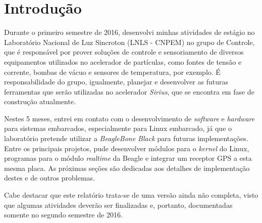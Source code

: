 \section {Introdução}

Durante o primeiro semestre de 2016, desenvolvi minhas atividades de estágio no
Laboratório Nacional de Luz Sincroton (LNLS - CNPEM) no grupo de Controle, que
é responsável por prover soluções de controle e sensoriamento de diversos
equipamentos utilizados no acelerador de partículas, como fontes de tensão e
corrente, bombas de vácuo e sensores de temperatura, por exemplo. É
responsabilidade do grupo, igualmente, planejar e desenvolver as futuras
ferramentas que serão utilizadas no acelerador \textit{Sirius}, que se encontra em fase de construção
atualmente.

\vspace{12pt}

Nestes 5 meses, entrei em contato com o desenvolvimento
de \textit{software} e \textit{hardware} para sistemas embarcados, especialmente
para Linux embarcado, já que o laboratório pretende utilizar a
\textit{BeagleBone Black} para futuras implementações. Entre os principais
projetos, pude desenvolver módulos para o \textit{kernel} do Linux, programas
para o módulo \textit{realtime} da Beagle e integrar um receptor GPS a esta
mesma placa. As próximas seções são dedicadas aos detalhes de implementação
destes e de outros problemas.

\vspace{12pt}

Cabe destacar que este relatório trata-se de uma versão ainda não completa,
visto que algumas atividades deverão ser finalizadas e, portanto, documentadas
somente no segundo semestre de 2016.

\newpage
